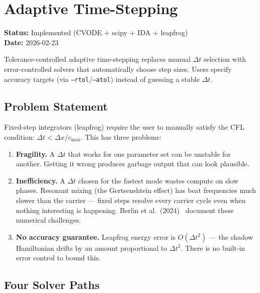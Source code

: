 
\section{Adaptive Time-Stepping}
\label{sec:adaptive-timestepping}

\textbf{Status:} Implemented (CVODE + scipy + IDA + leapfrog) \\
\textbf{Date:} 2026-02-23

Tolerance-controlled adaptive time-stepping replaces manual $\Delta t$ selection
with error-controlled solvers that automatically choose step sizes. Users
specify accuracy targets (via \texttt{--rtol}/\texttt{--atol}) instead of guessing a
stable $\Delta t$.

\subsection{Problem Statement}
\label{sec:at-problem}

Fixed-step integrators (leapfrog) require the user to manually satisfy the
CFL condition: $\Delta t < \Delta x / c_\mathrm{max}$. This has three problems:

\begin{enumerate}
  \item \textbf{Fragility.} A $\Delta t$ that works for one parameter set can be unstable
    for another. Getting it wrong produces garbage output that can look
    plausible.

  \item \textbf{Inefficiency.} A $\Delta t$ chosen for the fastest mode wastes compute on
    slow phases. Resonant mixing (the Gertsenshtein effect) has beat
    frequencies much slower than the carrier --- fixed steps resolve every
    carrier cycle even when nothing interesting is happening. Berlin et al.\
    (2024)~\cite{berlin2024axionphoton} document these numerical challenges.

  \item \textbf{No accuracy guarantee.} Leapfrog energy error is $O(\Delta t^2)$ --- the
    shadow Hamiltonian drifts by an amount proportional to $\Delta t^2$. There is no
    built-in error control to bound this.
\end{enumerate}

\subsection{Four Solver Paths}
\label{sec:solver-paths}

